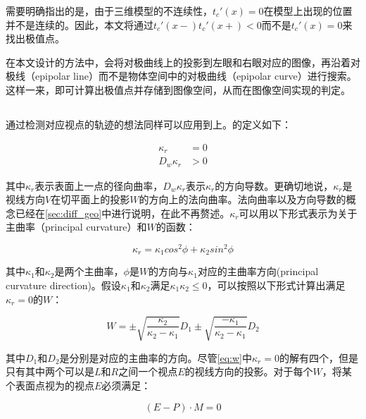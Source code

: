需要明确指出的是，由于三维模型的不连续性，$t_c'(x)=0$在模型上出现的位置并不是连续的。因此，本文将通过$t_c'(x-)t_c'(x+) < 0$而不是$t_c'(x)=0$来找出极值点。

在本文设计的方法中，会将对极曲线上的\conp{}投影到左眼和右眼对应的图像，再沿着对极线（epipolar line）而不是物体空间中的对极曲线（epipolar curve）进行搜索。这样一来，即可计算出极值点并存储到图像空间，从而在图像空间实现\epsl{}的判定。

\subsection{\scon{}}
\label{sec:suggestive_contour_math}
通过检测对应视点的轨迹的想法同样可以应用到\scon{}上。\scon{}的定义如下：

\begin{align}
  \kappa_r &= 0 \label{eq:Kr} \\
  D_w\kappa_r &> 0 \label{eq:DwKr} 
\end{align}

其中$\kappa_r$表示表面上一点的径向曲率，$D_w\kappa_r$表示$\kappa_r$的方向导数。更确切地说，$\kappa_r$是视线方向$V$在切平面上的投影$W$的方向上的法向曲率。法向曲率以及方向导数的概念已经在\autoref{sec:diff_geo}中进行说明，在此不再赘述。$\kappa_r$可以用以下形式表示为关于主曲率（principal curvature）和$W$的函数：

\begin{equation}\label{eq:normal curvature}
    \kappa_r = \kappa_1cos^2\phi+\kappa_2sin^2\phi
\end{equation}

其中$\kappa_1$和$\kappa_2$是两个主曲率，$\phi$是$W$的方向与$\kappa_1$对应的主曲率方向(principal curvature direction)。假设$\kappa_1$和$\kappa_2$满足$\kappa_1\kappa_2 \leq 0$，可以按照以下形式计算出满足$\kappa_r = 0$的$W$：

\begin{equation}\label{eq:w}
    W = \pm\sqrt{\frac{\kappa_2}{\kappa_2-\kappa_1}}D_1\pm\sqrt{\frac{-\kappa_1}{\kappa_2-\kappa_1}}D_2
\end{equation}

其中$D_1$和$D_2$是分别是对应的主曲率的方向。尽管\autoref{eq:w}中$\kappa_r = 0$的解有四个，但是只有其中两个可以是$L$和$R$之间一个视点$E$的视线方向的投影。对于每个$W$，将某个表面点视为\sconp{}的视点$E$必须满足：

\begin{equation}\label{eq:suggestive viewpoint}
    {(E - P)}\cdot{M} = 0
\end{equation}

